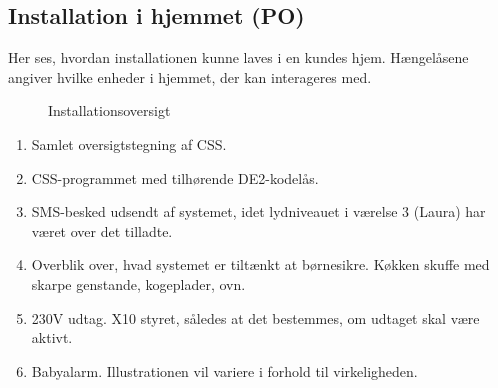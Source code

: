 \subsection*{Installation i hjemmet (PO)}

Her ses, hvordan installationen kunne laves i en kundes hjem. Hængelåsene angiver hvilke enheder i hjemmet, der kan interageres med.

\begin{figure}[H] \centering
{}
\caption{Installationsoversigt}
\label{fig:installationsoversigt}
\end{figure}

\begin{enumerate}
\item Samlet oversigtstegning af CSS. 
\item CSS-programmet med tilhørende DE2-kodelås.
\item SMS-besked udsendt af systemet, idet lydniveauet i værelse 3 (Laura) har været over det tilladte.
\item Overblik over, hvad systemet er tiltænkt at børnesikre. Køkken skuffe med skarpe genstande, kogeplader, ovn.
\item 230V udtag. X10 styret, således at det bestemmes, om udtaget skal være aktivt.
\item Babyalarm. Illustrationen vil variere i forhold til virkeligheden.
\end{enumerate}